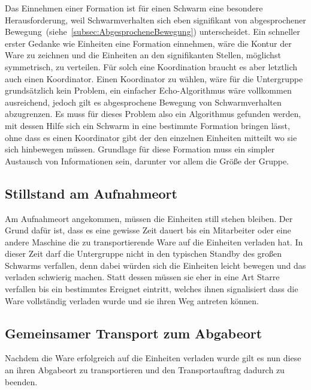 Das Einnehmen einer Formation ist für einen Schwarm eine besondere Herausforderung, weil Schwarmverhalten sich eben signifikant von abgesprochener Bewegung~(siehe~\autoref{subsec:AbgesprocheneBewegung}) unterscheidet.
Ein schneller erster Gedanke wie Einheiten eine Formation einnehmen, wäre die Kontur der Ware zu zeichnen und die Einheiten an den signifikanten Stellen, möglichst symmetrisch, zu verteilen.
Für solch eine Koordination braucht es aber letztlich auch einen Koordinator.
Einen Koordinator zu wählen, wäre für die Untergruppe grundsätzlich kein Problem, ein einfacher Echo-Algorithmus wäre vollkommen ausreichend, jedoch gilt es abgesprochene Bewegung von Schwarmverhalten abzugrenzen.
Es muss für dieses Problem also ein Algorithmus gefunden werden, mit dessen Hilfe sich ein Schwarm in eine bestimmte Formation bringen lässt, ohne dass es einen Koordinator gibt der den einzelnen Einheiten mitteilt wo sie sich hinbewegen müssen.
Grundlage für diese Formation muss ein simpler Austausch von Informationen sein, darunter vor allem die Größe der Gruppe.

\subsection*{Stillstand am Aufnahmeort}
Am Aufnahmeort angekommen, müssen die Einheiten still stehen bleiben.
Der Grund dafür ist, dass es eine gewisse Zeit dauert bis ein Mitarbeiter oder eine andere Maschine die zu transportierende Ware auf die Einheiten verladen hat.
In dieser Zeit darf die Untergruppe nicht in den typischen Standby des großen Schwarms verfallen, denn dabei würden sich die Einheiten leicht bewegen und das verladen schwierig machen.
Statt dessen müssen sie eher in eine Art Starre verfallen bis ein bestimmtes Ereignet eintritt, welches ihnen signalisiert dass die Ware vollständig verladen wurde und sie ihren Weg antreten können.

\subsection*{Gemeinsamer Transport zum Abgabeort}
Nachdem die Ware erfolgreich auf die Einheiten verladen wurde gilt es nun diese an ihren Abgabeort zu transportieren und den Transportauftrag dadurch zu beenden.

